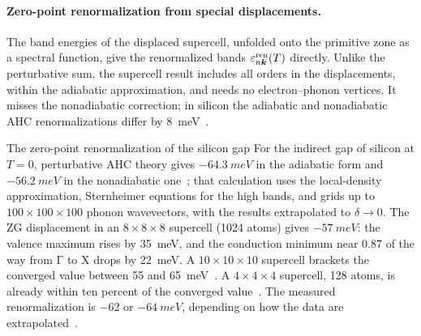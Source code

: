 \paragraph{Zero-point renormalization from special displacements.} The band energies of the displaced supercell, unfolded onto the primitive zone as a spectral function, give the renormalized bands $\varepsilon^{\mathrm{ren}}_{n\bm{k}}(T)$ directly. Unlike the perturbative sum, the supercell result includes all orders in the displacements, within the adiabatic approximation, and needs no electron--phonon vertices. It misses the nonadiabatic correction; in silicon the adiabatic and nonadiabatic AHC renormalizations differ by \SI{8}{meV}~\cite[Table~VI]{ponce2015temperature}.

\begin{workedexample}{The zero-point renormalization of the silicon gap}\label{we:E-zpr}
For the indirect gap of silicon at $T = 0$, perturbative AHC theory gives $-\SI{64.3}{meV}$ in the adiabatic form and $-\SI{56.2}{meV}$ in the nonadiabatic one~\cite[Table~VI]{ponce2015temperature}; that calculation uses the local-density approximation, Sternheimer equations for the high bands, and grids up to $100\times100\times100$ phonon wavevectors, with the results extrapolated to $\delta \to 0$. The ZG displacement in an $8\times8\times8$ supercell (1024 atoms) gives $-\SI{57}{meV}$: the valence maximum rises by \SI{35}{meV}, and the conduction minimum near $0.87$ of the way from $\mathrm{\Gamma}$ to $\mathrm{X}$ drops by \SI{22}{meV}. A $10\times10\times10$ supercell brackets the converged value between 55 and \SI{65}{meV}~\cite[Sect.~VII\,B]{zacharias2020theory}. A $4\times4\times4$ supercell, 128 atoms, is already within ten percent of the converged value~\cite[Sect.~VII]{zacharias2020theory}. The measured renormalization is $-62$ or $-\SI{64}{meV}$, depending on how the data are extrapolated~\cite[Table~VI]{ponce2015temperature}.


\end{workedexample}
